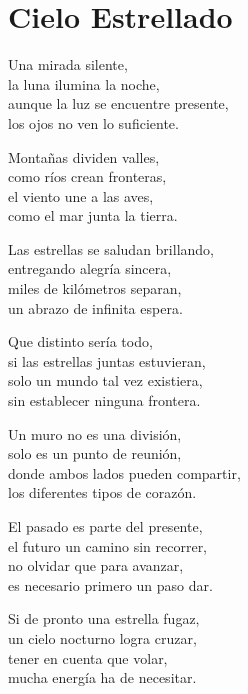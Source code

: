 \section*{Cielo Estrellado}
\label{CieloEstrellado}

\vspace{1em}
\begin{center}
Una mirada silente,\\ 
la luna ilumina la noche,\\ 
aunque la luz se encuentre presente,\\ 
los ojos no ven lo suficiente.

\vspace{1em} 
Montañas dividen valles,\\ 
como ríos crean fronteras,\\ 
el viento une a las aves,\\ 
como el mar junta la tierra.

\vspace{1em} 
Las estrellas se saludan brillando,\\ 
entregando alegría sincera,\\ 
miles de kilómetros separan,\\ 
un abrazo de infinita espera.

\vspace{1em} 
Que distinto sería todo,\\ 
si las estrellas juntas estuvieran,\\ 
solo un mundo tal vez existiera,\\ 
sin establecer ninguna frontera.

\vspace{1em} 
Un muro no es una división,\\ 
solo es un punto de reunión,\\ 
donde ambos lados pueden compartir,\\ 
los diferentes tipos de corazón.

\vspace{1em} 
El pasado es parte del presente,\\ 
el futuro un camino sin recorrer,\\ 
no olvidar que para avanzar,\\ 
es necesario primero un paso dar.

\vspace{1em} 
Si de pronto una estrella fugaz,\\ 
un cielo nocturno logra cruzar,\\ 
tener en cuenta que volar,\\ 
mucha energía ha de necesitar.


\end{center}
